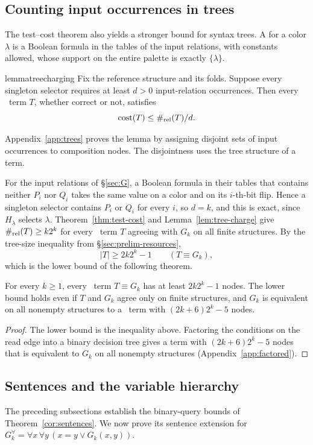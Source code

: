 \subsection{Counting input occurrences in trees}\label{sec:trees}
The test--cost theorem also yields a stronger bound for syntax trees.
A  for a color $\lambda$ is a
Boolean formula in the tables of the input relations, with constants
allowed, whose support on the entire palette is exactly $\{\lambda\}$.
\begin{restatable}{lemma}{treecharging}\label{lem:tree-charge}
Fix the reference structure and its folds. Suppose every singleton
selector requires at least $d>0$ input-relation occurrences.
Then every \CoR\ term $T$, whether correct or not, satisfies
\[
 \operatorname{cost}(T)\le \#_{\mathrm{rel}}(T)/d.
\]
\end{restatable}
Appendix~\ref{app:trees} proves the lemma by assigning disjoint sets of
input occurrences to composition nodes. The disjointness uses the tree
structure of a term.

For the input relations of \S\ref{sec:G}, a Boolean formula in their
tables that contains neither $P_i$ nor $Q_i$ takes the same value on a
color and on its $i$-th-bit flip. Hence a singleton selector contains
$P_i$ or $Q_i$ for every $i$, so $d=k$, and this is exact, since
$H_\lambda$ selects $\lambda$. Theorem~\ref{thm:test-cost} and
Lemma~\ref{lem:tree-charge} give $\#_{\mathrm{rel}}(T)\ge k2^k$ for every \CoR\
term $T$ agreeing with $G_k$ on all finite structures. By the
tree-size inequality from \S\ref{sec:prelim-resources},
\[
 |T|\ge2k2^k-1\qquad(T\equiv G_k),
\]
which is the lower bound of the following theorem.
\begin{theorem}\label{thm:tree}
For every $k\ge1$, every \CoR\ term $T\equiv G_k$ has at least $2k2^k-1$
nodes. The lower bound holds even if $T$ and $G_k$ agree only on
finite structures, and $G_k$ is equivalent on all nonempty structures
to a \CoR\ term with $(2k+6)2^k-5$ nodes.
\end{theorem}
\begin{proof}
The lower bound is the inequality above. Factoring the conditions on the
read edge into a binary decision tree gives a term with $(2k+6)2^k-5$
nodes that is equivalent to $G_k$ on all nonempty structures
(Appendix~\ref{app:factored}).
\end{proof}

\subsection{Sentences and the variable hierarchy}\label{sec:sentences}
The preceding subsections establish the binary-query bounds of
Theorem~\ref{cor:sentences}. We now prove its sentence extension for
$G_k^\forall=\forall x\,\forall y\,(x=y\lor G_k(x,y))$.


